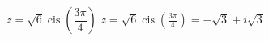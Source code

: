 { $z = \sqrt{6}\operatorname{cis}\left(\dfrac{3\pi}{4}\right)$ }
{ $z = \sqrt{6}\operatorname{cis}\left(\frac{3\pi}{4}\right) = -\sqrt{3}+i\sqrt{3}$ }
